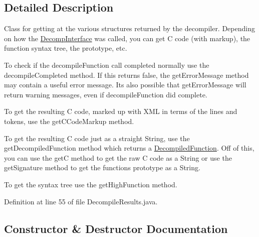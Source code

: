 \subsection{Detailed Description}
Class for getting at the various structures returned by the decompiler. Depending on how the \mbox{\hyperlink{classghidra_1_1app_1_1decompiler_1_1_decomp_interface}{Decomp\+Interface}} was called, you can get C code (with markup), the function\textquotesingle{} syntax tree, the prototype, etc.

To check if the decompile\+Function call completed normally use the decompile\+Completed method. If this returns false, the get\+Error\+Message method may contain a useful error message. Its also possible that get\+Error\+Message will return warning messages, even if decompile\+Function did complete.

To get the resulting C code, marked up with X\+ML in terms of the lines and tokens, use the get\+C\+Code\+Markup method.

To get the resulting C code just as a straight String, use the get\+Decompiled\+Function method which returns a \mbox{\hyperlink{classghidra_1_1app_1_1decompiler_1_1_decompiled_function}{Decompiled\+Function}}. Off of this, you can use the getC method to get the raw C code as a String or use the get\+Signature method to get the functions prototype as a String.

To get the syntax tree use the get\+High\+Function method. 

Definition at line 55 of file Decompile\+Results.\+java.



\subsection{Constructor \& Destructor Documentation}
\mbox{\label{classghidra_1_1app_1_1decompiler_1_1_decompile_results_a4e5409416abab86fe80ced741f490367}} 
